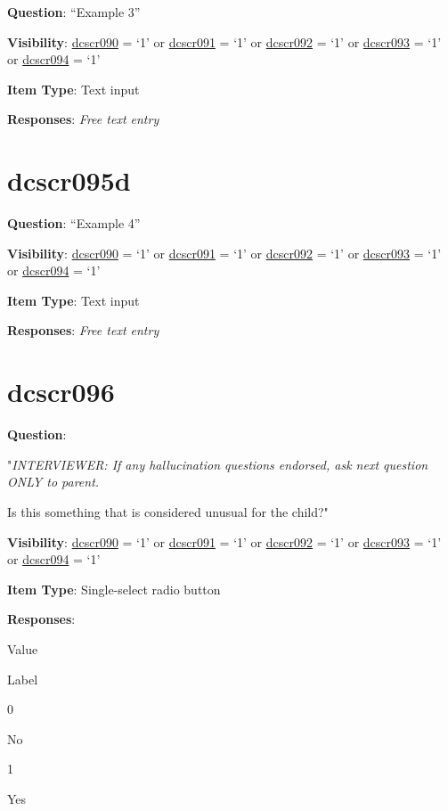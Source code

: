 \documentclass[]{book}
\begin{document}
\textbf{Question}: ``Example 3''

\textbf{Visibility}: \protect\hyperlink{dcscr090}{dcscr090} = `1' or \protect\hyperlink{dcscr091}{dcscr091} = `1' or \protect\hyperlink{dcscr092}{dcscr092} = `1' or \protect\hyperlink{dcscr093}{dcscr093} = `1' or \protect\hyperlink{dcscr094}{dcscr094} = `1'

\textbf{Item Type}: Text input

\textbf{Responses}: \emph{Free text entry}

\hypertarget{dcscr095d}{%
\section{dcscr095d}\label{dcscr095d}}

\textbf{Question}: ``Example 4''

\textbf{Visibility}: \protect\hyperlink{dcscr090}{dcscr090} = `1' or \protect\hyperlink{dcscr091}{dcscr091} = `1' or \protect\hyperlink{dcscr092}{dcscr092} = `1' or \protect\hyperlink{dcscr093}{dcscr093} = `1' or \protect\hyperlink{dcscr094}{dcscr094} = `1'

\textbf{Item Type}: Text input

\textbf{Responses}: \emph{Free text entry}

\hypertarget{dcscr096}{%
\section{dcscr096}\label{dcscr096}}

\textbf{Question}:

"\emph{INTERVIEWER: If any hallucination questions endorsed, ask next question ONLY to parent.}

Is this something that is considered unusual for the child?"

\textbf{Visibility}: \protect\hyperlink{dcscr090}{dcscr090} = `1' or \protect\hyperlink{dcscr091}{dcscr091} = `1' or \protect\hyperlink{dcscr092}{dcscr092} = `1' or \protect\hyperlink{dcscr093}{dcscr093} = `1' or \protect\hyperlink{dcscr094}{dcscr094} = `1'

\textbf{Item Type}: Single-select radio button

\textbf{Responses}:

Value

Label

0

No

1

Yes
\end{document}
